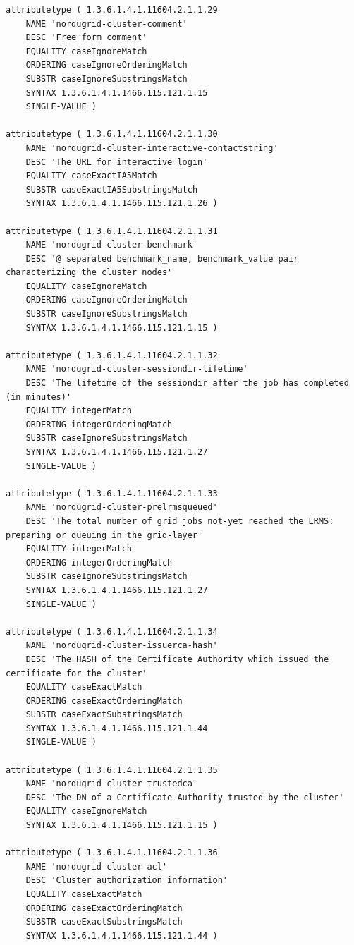 \documentclass{article}
\begin{document}
\begin{verbatim}
attributetype ( 1.3.6.1.4.1.11604.2.1.1.29
    NAME 'nordugrid-cluster-comment'
    DESC 'Free form comment'
    EQUALITY caseIgnoreMatch
    ORDERING caseIgnoreOrderingMatch
    SUBSTR caseIgnoreSubstringsMatch
    SYNTAX 1.3.6.1.4.1.1466.115.121.1.15
    SINGLE-VALUE )    
 
attributetype ( 1.3.6.1.4.1.11604.2.1.1.30
    NAME 'nordugrid-cluster-interactive-contactstring'
    DESC 'The URL for interactive login'
    EQUALITY caseExactIA5Match
    SUBSTR caseExactIA5SubstringsMatch
    SYNTAX 1.3.6.1.4.1.1466.115.121.1.26 ) 

attributetype ( 1.3.6.1.4.1.11604.2.1.1.31
    NAME 'nordugrid-cluster-benchmark'
    DESC '@ separated benchmark_name, benchmark_value pair characterizing the cluster nodes'
    EQUALITY caseIgnoreMatch
    ORDERING caseIgnoreOrderingMatch
    SUBSTR caseIgnoreSubstringsMatch
    SYNTAX 1.3.6.1.4.1.1466.115.121.1.15 ) 

attributetype ( 1.3.6.1.4.1.11604.2.1.1.32
    NAME 'nordugrid-cluster-sessiondir-lifetime'
    DESC 'The lifetime of the sessiondir after the job has completed (in minutes)'
    EQUALITY integerMatch
    ORDERING integerOrderingMatch
    SUBSTR caseIgnoreSubstringsMatch
    SYNTAX 1.3.6.1.4.1.1466.115.121.1.27
    SINGLE-VALUE )

attributetype ( 1.3.6.1.4.1.11604.2.1.1.33
    NAME 'nordugrid-cluster-prelrmsqueued'
    DESC 'The total number of grid jobs not-yet reached the LRMS: preparing or queuing in the grid-layer'
    EQUALITY integerMatch
    ORDERING integerOrderingMatch
    SUBSTR caseIgnoreSubstringsMatch
    SYNTAX 1.3.6.1.4.1.1466.115.121.1.27
    SINGLE-VALUE )   

attributetype ( 1.3.6.1.4.1.11604.2.1.1.34
    NAME 'nordugrid-cluster-issuerca-hash'
    DESC 'The HASH of the Certificate Authority which issued the certificate for the cluster'
    EQUALITY caseExactMatch
    ORDERING caseExactOrderingMatch
    SUBSTR caseExactSubstringsMatch
    SYNTAX 1.3.6.1.4.1.1466.115.121.1.44 
    SINGLE-VALUE )  

attributetype ( 1.3.6.1.4.1.11604.2.1.1.35
    NAME 'nordugrid-cluster-trustedca'
    DESC 'The DN of a Certificate Authority trusted by the cluster'
    EQUALITY caseIgnoreMatch
    SYNTAX 1.3.6.1.4.1.1466.115.121.1.15 )

attributetype ( 1.3.6.1.4.1.11604.2.1.1.36
    NAME 'nordugrid-cluster-acl'
    DESC 'Cluster authorization information'
    EQUALITY caseExactMatch
    ORDERING caseExactOrderingMatch
    SUBSTR caseExactSubstringsMatch
    SYNTAX 1.3.6.1.4.1.1466.115.121.1.44 )


\end{verbatim}
\end{document}
